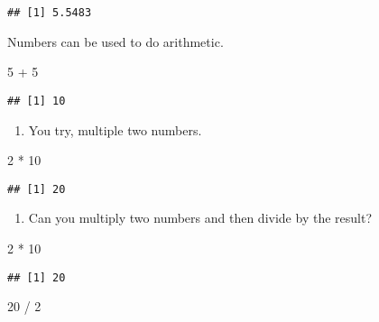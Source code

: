 \documentclass[
]{article}
\newenvironment{Shaded}{\begin{snugshade}}{\end{snugshade}}
\newcommand{\DecValTok}[1]{\textcolor[rgb]{0.00,0.00,0.81}{#1}}
\newcommand{\SpecialCharTok}[1]{\textcolor[rgb]{0.00,0.00,0.00}{#1}}
\providecommand{\tightlist}{%
  \setlength{\itemsep}{0pt}\setlength{\parskip}{0pt}}
\begin{document}
\begin{verbatim}
## [1] 5.5483
\end{verbatim}

Numbers can be used to do arithmetic.

\begin{Shaded}
\begin{Highlighting}[]
\DecValTok{5} \SpecialCharTok{+} \DecValTok{5}
\end{Highlighting}
\end{Shaded}

\begin{verbatim}
## [1] 10
\end{verbatim}

\begin{enumerate}
\def\labelenumi{(\arabic{enumi})}
\tightlist
\item
  You try, multiple two numbers.
\end{enumerate}

\begin{Shaded}
\begin{Highlighting}[]
\DecValTok{2} \SpecialCharTok{*} \DecValTok{10}
\end{Highlighting}
\end{Shaded}

\begin{verbatim}
## [1] 20
\end{verbatim}

\begin{enumerate}
\def\labelenumi{(\arabic{enumi})}
\setcounter{enumi}{1}
\tightlist
\item
  Can you multiply two numbers and then divide by the result?
\end{enumerate}

\begin{Shaded}
\begin{Highlighting}[]
\DecValTok{2} \SpecialCharTok{*} \DecValTok{10}
\end{Highlighting}
\end{Shaded}

\begin{verbatim}
## [1] 20
\end{verbatim}

\begin{Shaded}
\begin{Highlighting}[]
\DecValTok{20} \SpecialCharTok{/} \DecValTok{2}
\end{Highlighting}
\end{Shaded}
\end{document}
